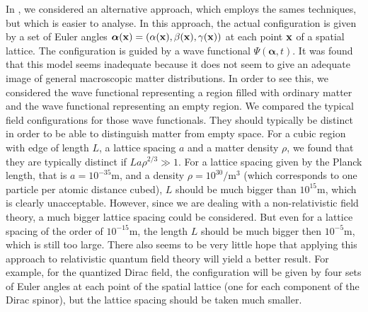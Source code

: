 \documentclass[12pt]{article}
\begin{document}
In \cite{struyve10}, we considered an alternative approach, which employs the sames techniques, but which is easier to analyse. In this approach, the actual configuration is given by a set of Euler angles ${\boldsymbol \alpha}({\bf x}) = (\alpha({\bf x}),\beta({\bf x}),\gamma({\bf x}))$ at each point ${\bf x}$ of a spatial lattice. The configuration is guided by a wave functional $\Psi({\boldsymbol \alpha},t)$. It was found that this model seems inadequate because it does not seem to give an adequate image of general macroscopic matter distributions. In order to see this, we considered the wave functional representing a region filled with ordinary matter and the wave functional representing an empty region. We compared the typical field configurations for those wave functionals. They should typically be distinct in order to be able to distinguish matter from empty space. For a cubic region with edge of length $L$, a lattice spacing $a$ and a matter density $\rho$, we found that they are typically distinct if $L a \rho^{2/3}\gg 1$. For a lattice spacing given by the Planck length, that is $a=10^{-35}$m, and a density $\rho = 10^{30}/$m$^3$ (which corresponds to one particle per atomic distance cubed), $L$ should be much bigger than $10^{15}$m, which is clearly unacceptable. However, since we are dealing with a non-relativistic field theory, a much bigger lattice spacing could be considered. But even for a lattice spacing of the order of $10^{-15}$m, the length $L$ should be much bigger then $10^{-5}$m, which is still too large. There also seems to be very little hope that applying this approach to relativistic quantum field theory will yield a better result. For example, for the quantized Dirac field, the configuration will be given by four sets of Euler angles at each point of the spatial lattice (one for each component of the Dirac spinor), but the lattice spacing should be taken much smaller.
\end{document}
